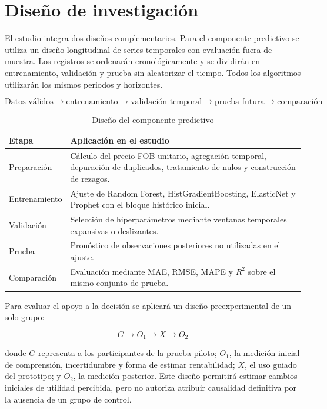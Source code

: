 \section{Diseño de investigación}

El estudio integra dos diseños complementarios. Para el componente predictivo se utiliza un diseño longitudinal de series temporales con evaluación fuera de muestra. Los registros se ordenarán cronológicamente y se dividirán en entrenamiento, validación y prueba sin aleatorizar el tiempo. Todos los algoritmos utilizarán los mismos periodos y horizontes.

\[
\text{Datos válidos}\rightarrow\text{entrenamiento}\rightarrow
\text{validación temporal}\rightarrow\text{prueba futura}\rightarrow
\text{comparación}
\]

\begin{table}[H]
\caption{Diseño del componente predictivo}
\centering
\small
\begin{tabularx}{0.95\textwidth}{p{3.5cm}X}
\toprule
\textbf{Etapa} & \textbf{Aplicación en el estudio} \\
\midrule
Preparación & Cálculo del precio FOB unitario, agregación temporal, depuración de duplicados, tratamiento de nulos y construcción de rezagos. \\
Entrenamiento & Ajuste de Random Forest, HistGradientBoosting, ElasticNet y Prophet con el bloque histórico inicial. \\
Validación & Selección de hiperparámetros mediante ventanas temporales expansivas o deslizantes. \\
Prueba & Pronóstico de observaciones posteriores no utilizadas en el ajuste. \\
Comparación & Evaluación mediante MAE, RMSE, MAPE y $R^2$ sobre el mismo conjunto de prueba. \\
\bottomrule
\end{tabularx}
\end{table}

Para evaluar el apoyo a la decisión se aplicará un diseño preexperimental de un solo grupo:

\[
G\rightarrow O_1\rightarrow X\rightarrow O_2
\]

donde $G$ representa a los participantes de la prueba piloto; $O_1$, la medición inicial de comprensión, incertidumbre y forma de estimar rentabilidad; $X$, el uso guiado del prototipo; y $O_2$, la medición posterior. Este diseño permitirá estimar cambios iniciales de utilidad percibida, pero no autoriza atribuir causalidad definitiva por la ausencia de un grupo de control.

